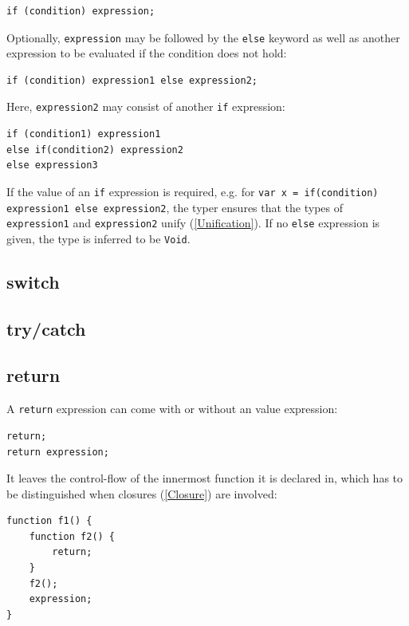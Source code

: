 \documentclass{article}
\newcommand{\type}[1]{\texttt{#1}}
\newcommand{\expr}[1]{\texttt{#1}}
\newcommand{\tref}[2]{#1 (\ref{#2})}
\begin{document}
\begin{lstlisting}
if (condition) expression;
\end{lstlisting}

Optionally, \expr{expression} may be followed by the \expr{else} keyword as well as another expression to be evaluated if the condition does not hold:

\begin{lstlisting}
if (condition) expression1 else expression2;
\end{lstlisting}

Here, \expr{expression2} may consist of another \expr{if} expression:

\begin{lstlisting}
if (condition1) expression1
else if(condition2) expression2
else expression3
\end{lstlisting}

If the value of an \expr{if} expression is required, e.g. for \expr{var x = if(condition) expression1 else expression2}, the typer ensures that the types of \expr{expression1} and \expr{expression2} \tref{unify}{Unification}. If no \expr{else} expression is given, the type is inferred to be \type{Void}.


\subsection{switch}
\label{switch}

\subsection{try/catch}
\label{try/catch}

\subsection{return}
\label{return}

A \expr{return} expression can come with or without an value expression:

\begin{lstlisting}
return;
return expression;
\end{lstlisting}

It leaves the control-flow of the innermost function it is declared in, which has to be distinguished when \tref{closures}{Closure} are involved:

\begin{lstlisting}
function f1() {
	function f2() {
		return;
	}
	f2();
	expression;
}
\end{lstlisting}
\end{document}
